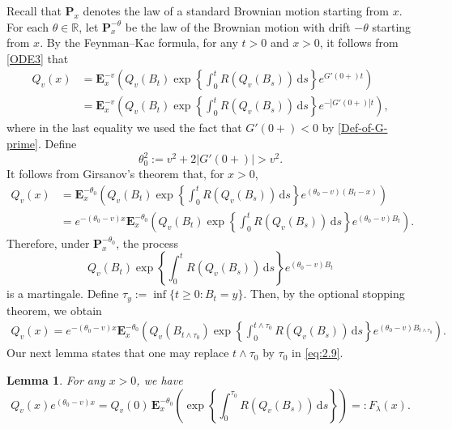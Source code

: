 \documentclass[11pt]{article}
\newtheorem{lemma}[thrm]{Lemma}
\numberwithin{equation}{section}
\begin{document}
Recall that $\mathbf P_x$ denotes the law of a standard Brownian motion starting from $x$. 
For each $\theta\in \mathbb{R}$, let $\mathbf P_x^{-\theta}$ be the law of the Brownian motion with drift $-\theta$ starting from $x$. 
By the Feynman--Kac formula, for any $t > 0$ and $x > 0$, it follows from \eqref{ODE3} that
\begin{align}
	Q_v(x) 
	&= \mathbf E^{-v}_x \left( Q_v(B_t) \exp\left\{ \int_0^t R(Q_v(B_s)) \, \mathrm{d}s \right\} e^{G'(0+) t} \right) \nonumber\\
	&= \mathbf E^{-v}_x \left( Q_v(B_t) \exp\left\{ \int_0^t R(Q_v(B_s)) \, \mathrm{d}s \right\} e^{-|G'(0+)| t} \right),
\end{align}
where in the last equality we used the fact that $G'(0+) < 0$ by \eqref{Def-of-G-prime}.
Define
\begin{equation}\label{theta_0}
	\theta_0^2 := v^2 + 2 |G'(0+)| > v^2.
\end{equation}
It follows from Girsanov's theorem that, for $x > 0$,
\begin{align*}
	Q_v(x) 
	&= \mathbf E^{-\theta_0}_x
	\left( Q_v(B_t) \exp\left\{ \int_0^t R(Q_v(B_s)) \, \mathrm{d}s \right\} e^{(\theta_0 - v)(B_t - x)} \right) \nonumber\\
	&= e^{-(\theta_0 - v)x} \mathbf E^{-\theta_0}_x
	\left( Q_v(B_t) \exp\left\{ \int_0^t R(Q_v(B_s)) \, \mathrm{d}s \right\} e^{(\theta_0 - v) B_t} \right).
\end{align*}
Therefore, under $\mathbf{P}_x^{-\theta_0}$, the process
\[
Q_v(B_t) \exp\left\{ \int_0^t R(Q_v(B_s)) \, \mathrm{d}s \right\} e^{(\theta_0 - v) B_t}
\]
is a martingale. Define $\tau_y := \inf\{ t \ge 0 : B_t = y \}$. Then, by the optional stopping theorem, we obtain
\begin{align}\label{eq:2.9}
	Q_v(x) = e^{-(\theta_0 - v)x} \mathbf E^{-\theta_0}_x
	\left( Q_v(B_{t \wedge \tau_0}) \exp\left\{ \int_0^{t \wedge \tau_0} R(Q_v(B_s)) \, \mathrm{d}s \right\} e^{(\theta_0 - v) B_{t \wedge \tau_0}} \right).
\end{align}
Our next lemma states that one may replace $t \wedge \tau_0$ by $\tau_0$ in \eqref{eq:2.9}.

\begin{lemma}\label{le:2.1}
For any $x > 0$, we have
\[
Q_v(x) e^{(\theta_0 - v)x}
= Q_v(0) \, \mathbf E^{-\theta_0}_x
\left( \exp\left\{ \int_0^{\tau_0} R(Q_v(B_s)) \, \mathrm{d}s \right\} \right)
=: F_\lambda(x).
\]
\end{lemma}
\end{document}
